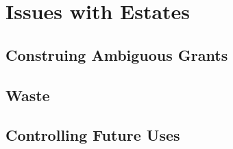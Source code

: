 \chapter{Issues with Estates}

\section{Construing Ambiguous Grants}






\begin{questions}

\end{questions}



\section{Waste}






\begin{questions}

\end{questions}




\section{Controlling Future Uses}





\begin{questions}

\end{questions}




\begin{questions}

\end{questions}




\begin{questions}

\end{questions}

